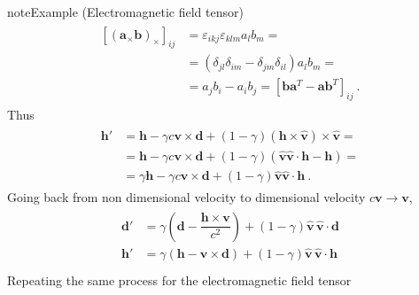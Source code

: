 \documentclass[letterpaper,10pt,english]{jupyterBook}
\begin{document}
\begin{sphinxadmonition}{note}{Example  (Electromagnetic field tensor)}
\begin{equation*}
\begin{split}\begin{aligned}
  \left[ \left(\mathbf{a}_{\times} \mathbf{b} \right)_{\times} \right]_{ij} 
  & = \varepsilon_{ikj} \varepsilon_{klm} a_l b_m = \\
  & = \left( \delta_{jl} \delta_{im} - \delta_{jm} \delta_{il} \right) a_l b_m = \\
  & = a_j b_i - a_i b_j = \left[ \mathbf{b} \mathbf{a}^T - \mathbf{a} \mathbf{b}^T \right]_{ij} \ . 
\end{aligned}\end{split}
\end{equation*}
\sphinxAtStartPar
Thus
\begin{equation*}
\begin{split}\begin{aligned}
\mathbf{h}' 
  & = \mathbf{h} - \gamma c \mathbf{v} \times \mathbf{d} + (1 -\gamma) (\mathbf{h} \times \hat{\mathbf{v}}) \times \hat{\mathbf{v}} = \\
  & = \mathbf{h} - \gamma c \mathbf{v} \times \mathbf{d} + (1 -\gamma) \left( \hat{\mathbf{v}} \hat{\mathbf{v}} \cdot \mathbf{h} - \mathbf{h}  \right) = \\
  & = \gamma \mathbf{h} - \gamma c \mathbf{v} \times \mathbf{d} + (1 -\gamma) \hat{\mathbf{v}} \hat{\mathbf{v}} \cdot \mathbf{h} \ .
\end{aligned}\end{split}
\end{equation*}
\sphinxAtStartPar
Going back from non dimensional velocity to dimensional velocity \(c \mathbf{v} \rightarrow \mathbf{v}\),
\begin{equation*}
\begin{split}\begin{aligned}
  \mathbf{d}' & = \gamma \left( \mathbf{d} - \dfrac{\mathbf{h} \times \mathbf{v}}{c^2} \right) + (1-\gamma) \hat{\mathbf{v}} \, \hat{\mathbf{v}} \cdot \mathbf{d} \\
  \mathbf{h}' & = \gamma \left( \mathbf{h} - \mathbf{v} \times \mathbf{d} \right) + (1 - \gamma) \hat{\mathbf{v}} \, \hat{\mathbf{v}} \cdot \mathbf{h} \\
\end{aligned}\end{split}
\end{equation*}
\sphinxAtStartPar
Repeating the same process for the electromagnetic field tensor
\begin{equation*}
\begin{split}\begin{aligned}

\end{aligned}
\end{split}
\end{equation*}
\end{sphinxadmonition}
\end{document}
